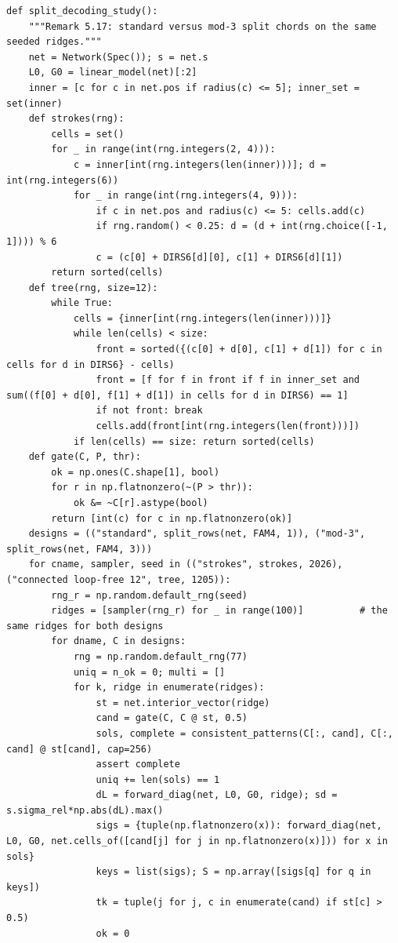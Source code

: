 \documentclass[11pt,a4paper]{article}
\theoremstyle{definition}
\theoremstyle{remark}
\begin{document}
\begin{lstlisting}
def split_decoding_study():
    """Remark 5.17: standard versus mod-3 split chords on the same seeded ridges."""
    net = Network(Spec()); s = net.s
    L0, G0 = linear_model(net)[:2]
    inner = [c for c in net.pos if radius(c) <= 5]; inner_set = set(inner)
    def strokes(rng):
        cells = set()
        for _ in range(int(rng.integers(2, 4))):
            c = inner[int(rng.integers(len(inner)))]; d = int(rng.integers(6))
            for _ in range(int(rng.integers(4, 9))):
                if c in net.pos and radius(c) <= 5: cells.add(c)
                if rng.random() < 0.25: d = (d + int(rng.choice([-1, 1]))) % 6
                c = (c[0] + DIRS6[d][0], c[1] + DIRS6[d][1])
        return sorted(cells)
    def tree(rng, size=12):
        while True:
            cells = {inner[int(rng.integers(len(inner)))]}
            while len(cells) < size:
                front = sorted({(c[0] + d[0], c[1] + d[1]) for c in cells for d in DIRS6} - cells)
                front = [f for f in front if f in inner_set and sum((f[0] + d[0], f[1] + d[1]) in cells for d in DIRS6) == 1]
                if not front: break
                cells.add(front[int(rng.integers(len(front)))])
            if len(cells) == size: return sorted(cells)
    def gate(C, P, thr):
        ok = np.ones(C.shape[1], bool)
        for r in np.flatnonzero(~(P > thr)):
            ok &= ~C[r].astype(bool)
        return [int(c) for c in np.flatnonzero(ok)]
    designs = (("standard", split_rows(net, FAM4, 1)), ("mod-3", split_rows(net, FAM4, 3)))
    for cname, sampler, seed in (("strokes", strokes, 2026), ("connected loop-free 12", tree, 1205)):
        rng_r = np.random.default_rng(seed)
        ridges = [sampler(rng_r) for _ in range(100)]          # the same ridges for both designs
        for dname, C in designs:
            rng = np.random.default_rng(77)
            uniq = n_ok = 0; multi = []
            for k, ridge in enumerate(ridges):
                st = net.interior_vector(ridge)
                cand = gate(C, C @ st, 0.5)
                sols, complete = consistent_patterns(C[:, cand], C[:, cand] @ st[cand], cap=256)
                assert complete
                uniq += len(sols) == 1
                dL = forward_diag(net, L0, G0, ridge); sd = s.sigma_rel*np.abs(dL).max()
                sigs = {tuple(np.flatnonzero(x)): forward_diag(net, L0, G0, net.cells_of([cand[j] for j in np.flatnonzero(x)])) for x in sols}
                keys = list(sigs); S = np.array([sigs[q] for q in keys])
                tk = tuple(j for j, c in enumerate(cand) if st[c] > 0.5)
                ok = 0

\end{lstlisting}
\end{document}
